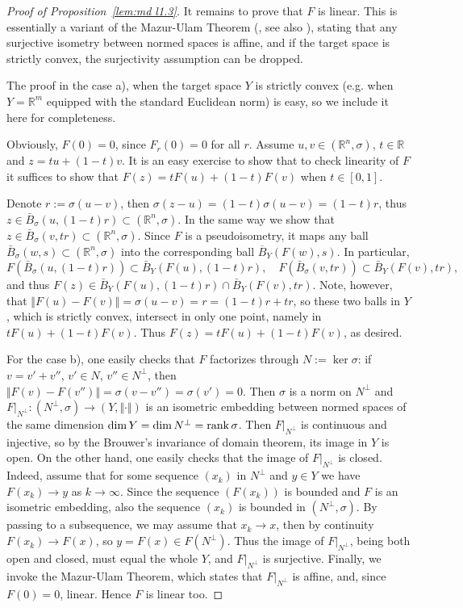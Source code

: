 \documentclass[12pt,leqno]{amsart}
\theoremstyle{definition}
\newcommand{\bbbr}{\mathbb R}
\def\rank{{\rm rank\,}}
\numberwithin{theorem}{section} \numberwithin{equation}{section}
\begin{document}
\begin{proof}[Proof of Proposition~\ref{lem:md l1.3}]
It remains to prove that $F$ is linear. This is essentially a variant of the Mazur-Ulam Theorem (\cite{MazurUlam, Vaisala}, see also \cite[Theorem 14.1.3]{AlbiacKalton}), stating that any surjective isometry between normed spaces is affine, and if the target space is strictly convex, the surjectivity assumption can be dropped.

The proof in the case a), when the target space $Y$ is strictly convex (e.g. when $Y=\bbbr^m$ equipped with the standard Euclidean norm) is easy, so we include it here for completeness.



Obviously, $F(0)=0$, since $F_r(0)=0$ for all $r$.
Assume $u,v\in (\bbbr^n,\sigma)$, $t\in \bbbr$ and $z=tu+(1-t)v$. It is an easy exercise to show that to check linearity of $F$ it suffices to show that $F(z)=tF(u)+(1-t)F(v)$ when $t\in[0,1]$.

Denote $r:=\sigma(u-v)$, then $\sigma(z-u)=(1-t)\sigma(u-v)=(1-t)r$, thus $z\in \bar{B}_\sigma(u,(1-t)r)\subset (\bbbr^n,\sigma)$. In the same way we show that $z\in\bar{B}_\sigma(v,tr)\subset (\bbbr^n,\sigma)$. Since $F$ is a pseudoisometry, it maps any ball $\bar{B}_\sigma(w,s)\subset (\bbbr^n,\sigma)$ into the corresponding ball $\overline{B}_Y(F(w),s)$. In particular,
$$
F(\bar{B}_\sigma(u,(1-t)r))\subset\bar{B}_Y(F(u),(1-t)r), \quad F(\bar{B}_\sigma(v,tr))\subset\bar{B}_Y(F(v),tr),
$$
and thus $F(z)\in \bar{B}_Y(F(u),(1-t)r)\cap \bar{B}_Y(F(v),tr)$. Note, however, that $\Vert F(u)-F(v)\Vert =\sigma(u-v)=r=(1-t)r+tr$, so these two balls in $Y$, which is strictly convex, intersect in only one point, namely in $tF(u)+(1-t)F(v)$. Thus $F(z)=tF(u)+(1-t)F(v)$, as desired.

For the case b), one easily checks that $F$ factorizes through $N:=\ker \sigma$: if $v=v'+v''$, $v'\in N$, $v''\in N^\perp$, then $\Vert F(v)-F(v'')\Vert=\sigma(v-v'')=\sigma(v')=0$. Then $\sigma$ is a norm on $N^\perp$ and $F|_{N^\perp}:(N^\perp,\sigma)\to (Y,\Vert\cdot\Vert)$ is an isometric embedding between normed spaces of the same dimension $\dim Y=\dim N^\perp=\rank \sigma$. Then $F|_{N^\perp}$ is continuous and injective, so by the Brouwer's invariance of domain theorem, its image in $Y$ is open. On the other hand, one easily checks that the image of $F|_{N^\perp}$ is closed. Indeed, assume that for some sequence  $(x_k)$ in $N^\perp$ and $y\in Y$ we have $F(x_k)\to y$ as $k\to\infty$. Since the sequence $(F(x_k))$ is bounded and $F$ is an isometric embedding, also the sequence $(x_k)$ is bounded in $(N^\perp,\sigma)$.  By passing to a subsequence, we may assume that $x_k\to x$, then by continuity $F(x_k)\to F(x)$, so $y=F(x)\in F(N^\perp)$. Thus the image of $F|_{N^\perp}$, being both open and closed, must equal the whole $Y$, and $F|_{N^\perp}$ is surjective. Finally, we invoke the Mazur-Ulam Theorem, which states that $F|_{N^\perp}$ is affine, and, since $F(0)=0$, linear. Hence $F$ is linear too.
\end{proof}
\end{document}
